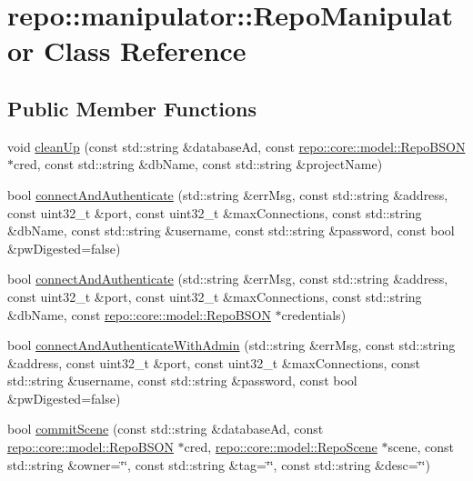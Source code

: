 \hypertarget{classrepo_1_1manipulator_1_1_repo_manipulator}{}\section{repo\+:\+:manipulator\+:\+:Repo\+Manipulator Class Reference}
\label{classrepo_1_1manipulator_1_1_repo_manipulator}
\subsection*{Public Member Functions}
\begin{DoxyCompactItemize}
\item 
void \hyperlink{classrepo_1_1manipulator_1_1_repo_manipulator_a5c82f46fb127c100d8335b6a7e128174}{clean\+Up} (const std\+::string \&database\+Ad, const \hyperlink{classrepo_1_1core_1_1model_1_1_repo_b_s_o_n}{repo\+::core\+::model\+::\+Repo\+B\+S\+O\+N} $\ast$cred, const std\+::string \&db\+Name, const std\+::string \&project\+Name)
\item 
bool \hyperlink{classrepo_1_1manipulator_1_1_repo_manipulator_a8d2ed018a2af9218689c3ea63504f3f1}{connect\+And\+Authenticate} (std\+::string \&err\+Msg, const std\+::string \&address, const uint32\+\_\+t \&port, const uint32\+\_\+t \&max\+Connections, const std\+::string \&db\+Name, const std\+::string \&username, const std\+::string \&password, const bool \&pw\+Digested=false)
\item 
bool \hyperlink{classrepo_1_1manipulator_1_1_repo_manipulator_ae31236c3f6506ae9cd7c307ce965d715}{connect\+And\+Authenticate} (std\+::string \&err\+Msg, const std\+::string \&address, const uint32\+\_\+t \&port, const uint32\+\_\+t \&max\+Connections, const std\+::string \&db\+Name, const \hyperlink{classrepo_1_1core_1_1model_1_1_repo_b_s_o_n}{repo\+::core\+::model\+::\+Repo\+B\+S\+O\+N} $\ast$credentials)
\item 
bool \hyperlink{classrepo_1_1manipulator_1_1_repo_manipulator_a0fa775b650c6ac63e171e0047dae0387}{connect\+And\+Authenticate\+With\+Admin} (std\+::string \&err\+Msg, const std\+::string \&address, const uint32\+\_\+t \&port, const uint32\+\_\+t \&max\+Connections, const std\+::string \&username, const std\+::string \&password, const bool \&pw\+Digested=false)
\item 
bool \hyperlink{classrepo_1_1manipulator_1_1_repo_manipulator_a9e8ac2e2c3af8c1a93a4a9d3e2c8348b}{commit\+Scene} (const std\+::string \&database\+Ad, const \hyperlink{classrepo_1_1core_1_1model_1_1_repo_b_s_o_n}{repo\+::core\+::model\+::\+Repo\+B\+S\+O\+N} $\ast$cred, \hyperlink{classrepo_1_1core_1_1model_1_1_repo_scene}{repo\+::core\+::model\+::\+Repo\+Scene} $\ast$scene, const std\+::string \&owner=\char`\"{}\char`\"{}, const std\+::string \&tag=\char`\"{}\char`\"{}, const std\+::string \&desc=\char`\"{}\char`\"{})

\end{DoxyCompactItemize}
